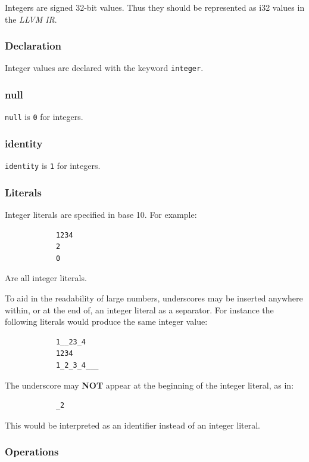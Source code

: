\documentclass{article}
\begin{document}
		Integers are signed 32-bit values. Thus they should be represented as i32 values in the \textit{LLVM IR}.

	\subsubsection{Declaration}

		Integer values are declared with the keyword \texttt{integer}.

	\subsubsection{null}

		\texttt{null} is \texttt{0} for integers.

	\subsubsection{identity}

		\texttt{identity} is \texttt{1} for integers.

	\subsubsection{Literals}

		Integer literals are specified in base 10. For example:

		\begin{lstlisting}
			1234
			2
			0
		\end{lstlisting}

		Are all integer literals.

		To aid in the readability of large numbers, underscores may be inserted anywhere within, or at the end of, an
		integer literal as a separator. For instance the following literals would produce the same integer value:

		\begin{lstlisting}
			1__23_4
			1234
			1_2_3_4___
		\end{lstlisting}

		The underscore may \textbf{NOT} appear at the beginning of the integer literal, as in:

		\begin{lstlisting}
			_2
		\end{lstlisting}

		This would be interpreted as an identifier instead of an integer literal.

	\subsubsection{Operations}
\end{document}
